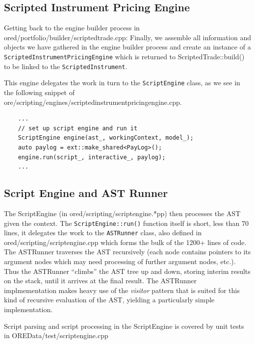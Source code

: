 \documentclass[12pt, a4paper]{report}
\begin{document}
\subsection{Scripted Instrument Pricing Engine}

Getting back to the engine builder process in ored/portfolio/builder/scriptedtrade.cpp:
Finally, we assemble all information and objects we have gathered in the engine builder process and
create an instance of a {\tt ScriptedInstrumentPricingEngine} which is returned to
ScriptedTrade::build() to be linked to the {\tt ScriptedInstrument}.

This engine delegates the work in turn to the {\tt ScriptEngine} class, as we see in the following
snippet of ore/scripting/engines/scriptedinstrumentpricingengine.cpp.

\begin{verbatim}
    ...
    // set up script engine and run it
    ScriptEngine engine(ast_, workingContext, model_);
    auto paylog = ext::make_shared<PayLog>();
    engine.run(script_, interactive_, paylog);
    ...
\end{verbatim}

\subsection{Script Engine and AST Runner}

The ScriptEngine (in ored/scripting/scriptengine.*pp) then processes the AST given the context.
The {\tt ScriptEngine::run()} function itself is short, less than 70 lines, it delegates the work
to the {\tt ASTRunner} class, also defined in ored/scripting/scriptengine.cpp which forms the bulk
of the 1200+ lines of code. The ASTRunner traverses the AST recursively (each node contains pointers
to its argument nodes which may need processing of further argument nodes, etc.). Thus the ASTRunner
``climbs'' the AST tree up and down, storing interim results on the stack, until it arrives at the
final result. The ASTRunner implmementation makes heavy use of the {\em visitor} pattern that
is suited for this kind of recursive evaluation of the AST, yielding a particularly simple
implementation. 

Script parsing and script processing in the ScriptEngine is covered by unit tests in
OREData/test/scriptengine.cpp


\end{document}
